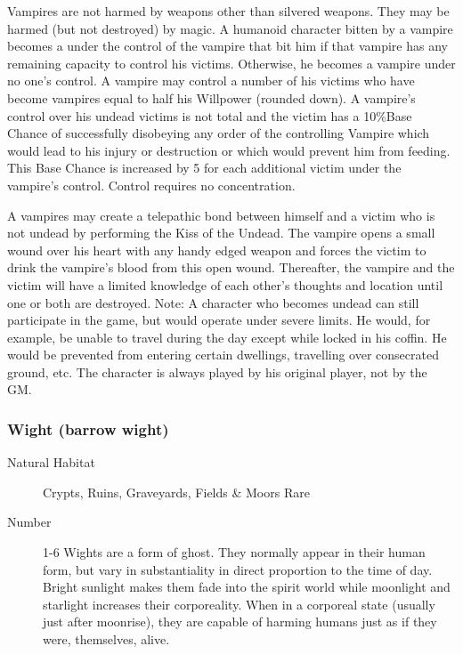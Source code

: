 \begin{multicols}{2}
\begin{description}
\setlength\itemsep{0pt}

\item[Comments] Vampires are not harmed by weapons other than silvered
weapons. They may be harmed (but not destroyed) by magic.  A humanoid
character bitten by a vampire becomes a under the control of the
vampire that bit him if that vampire has any remaining capacity to
control his victims. Otherwise, he becomes a vampire under no one's
control. A vampire may control a number of his victims who have become
vampires equal to half his Willpower (rounded down). A vampire's
control over his undead victims is not total and the victim has a 10\%Base Chance of successfully disobeying any order of the controlling
Vampire which would lead to his injury or destruction or which would
prevent him from feeding. This Base Chance is increased by 5 for each
additional victim under the vampire's control. Control requires no
concentration.

A vampires may create a telepathic bond between himself and a victim
who is not undead by performing the Kiss of the Undead.  The vampire
opens a small wound over his heart with any handy edged weapon and
forces the victim to drink the vampire's blood from this open
wound. Thereafter, the vampire and the victim will have a limited
knowledge of each other's thoughts and location until one or both are
destroyed.  Note: A character who becomes undead can still participate
in the game, but would operate under severe limits. He would, for
example, be unable to travel during the day except while locked in his
coffin. He would be prevented from entering certain dwellings,
travelling over consecrated ground, etc. The character is always
played by his original player, not by the GM.

\end{description}

\subsubsection{Wight (barrow wight)}

\begin{description}
\item[Natural Habitat]  Crypts, Ruins, Graveyards, Fields \& Moors Rare

\item[Number] 1-6
 Wights are a form of ghost. They normally appear in
their human form, but vary in substantiality in direct proportion to
the time of day. Bright sunlight makes them fade into the spirit world
while moonlight and starlight increases their corporeality. When in a
corporeal state (usually just after moonrise), they are capable of
harming humans just as if they were, themselves, alive.


\end{description}
\end{multicols}
